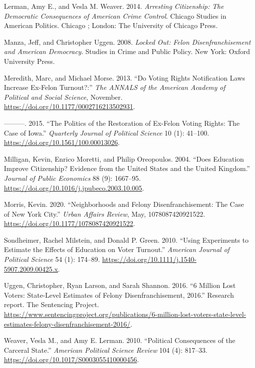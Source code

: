 \documentclass[
  12pt,
]{article}
\newlength{\cslhangindent}
\newenvironment{cslreferences}%
  {\setlength{\parindent}{0pt}%
  \everypar{\setlength{\hangindent}{\cslhangindent}}\ignorespaces}%
  {\par}
\begin{document}
\begin{cslreferences}
\leavevmode\hypertarget{ref-Lerman2014}{}%
Lerman, Amy E., and Vesla M. Weaver. 2014. \emph{Arresting Citizenship: The Democratic Consequences of American Crime Control}. Chicago Studies in American Politics. Chicago ; London: The University of Chicago Press.

\leavevmode\hypertarget{ref-locked_out}{}%
Manza, Jeff, and Christopher Uggen. 2008. \emph{Locked Out: Felon Disenfranchisement and American Democracy}. Studies in Crime and Public Policy. New York: Oxford University Press.

\leavevmode\hypertarget{ref-Meredith2013}{}%
Meredith, Marc, and Michael Morse. 2013. ``Do Voting Rights Notification Laws Increase Ex-Felon Turnout?:'' \emph{The ANNALS of the American Academy of Political and Social Science}, November. \url{https://doi.org/10.1177/0002716213502931}.

\leavevmode\hypertarget{ref-Meredith2015}{}%
---------. 2015. ``The Politics of the Restoration of Ex-Felon Voting Rights: The Case of Iowa.'' \emph{Quarterly Journal of Political Science} 10 (1): 41--100. \url{https://doi.org/10.1561/100.00013026}.

\leavevmode\hypertarget{ref-Milligan2004}{}%
Milligan, Kevin, Enrico Moretti, and Philip Oreopoulos. 2004. ``Does Education Improve Citizenship? Evidence from the United States and the United Kingdom.'' \emph{Journal of Public Economics} 88 (9): 1667--95. \url{https://doi.org/10.1016/j.jpubeco.2003.10.005}.

\leavevmode\hypertarget{ref-Morris2020}{}%
Morris, Kevin. 2020. ``Neighborhoods and Felony Disenfranchisement: The Case of New York City.'' \emph{Urban Affairs Review}, May, 1078087420921522. \url{https://doi.org/10.1177/1078087420921522}.

\leavevmode\hypertarget{ref-Sondheimer2010}{}%
Sondheimer, Rachel Milstein, and Donald P. Green. 2010. ``Using Experiments to Estimate the Effects of Education on Voter Turnout.'' \emph{American Journal of Political Science} 54 (1): 174--89. \url{https://doi.org/10.1111/j.1540-5907.2009.00425.x}.

\leavevmode\hypertarget{ref-sentencing_2016}{}%
Uggen, Christopher, Ryan Larson, and Sarah Shannon. 2016. ``6 Million Lost Voters: State-Level Estimates of Felony Disenfranchisement, 2016.'' Research report. The Sentencing Project. \url{https://www.sentencingproject.org/publications/6-million-lost-voters-state-level-estimates-felony-disenfranchisement-2016/}.

\leavevmode\hypertarget{ref-Weaver2010}{}%
Weaver, Vesla M., and Amy E. Lerman. 2010. ``Political Consequences of the Carceral State.'' \emph{American Political Science Review} 104 (4): 817--33. \url{https://doi.org/10.1017/S0003055410000456}.


\end{cslreferences}
\end{document}
